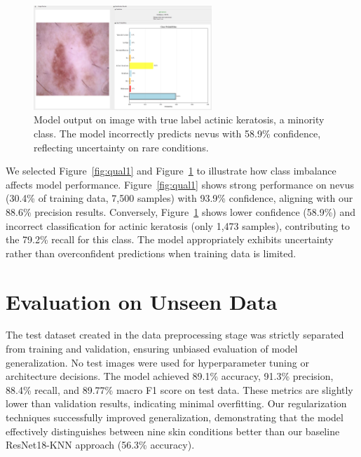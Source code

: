 \documentclass{article} %
\begin{document}
\begin{figure}[H]
\begin{center}
\includegraphics[width=0.6\textwidth]{Figs/actinic_prediction.png}
\end{center}
\caption{Model output on image with true label actinic keratosis, a minority class. The model incorrectly predicts nevus with 58.9\% confidence, reflecting uncertainty on rare conditions.}
\label{fig:qual2}
\end{figure}


We selected Figure~\ref{fig:qual1} and Figure~\ref{fig:qual2} to illustrate how class imbalance affects model performance. Figure~\ref{fig:qual1} shows strong performance on nevus (30.4\% of training data, 7,500 samples) with 93.9\% confidence, aligning with our 88.6\% precision results. Conversely, Figure~\ref{fig:qual2} shows lower confidence (58.9\%) and incorrect classification for actinic keratosis (only 1,473 samples), contributing to the 79.2\% recall for this class. The model appropriately exhibits uncertainty rather than overconfident predictions when training data is limited.

\section{Evaluation on Unseen Data}

The test dataset created in the data preprocessing stage was strictly separated from training and validation, ensuring unbiased evaluation of model generalization. No test images were used for hyperparameter tuning or architecture decisions. The model achieved 89.1\% accuracy, 91.3\% precision, 88.4\% recall, and 89.77\% macro F1 score on test data. These metrics are slightly lower than validation results, indicating minimal overfitting. Our regularization techniques successfully improved generalization, demonstrating that the model effectively distinguishes between nine skin conditions better than our baseline ResNet18-KNN approach (56.3\% accuracy).
\end{document}
